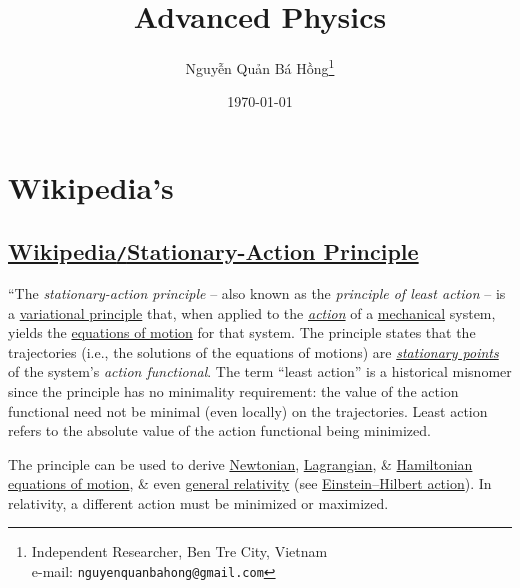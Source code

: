 \documentclass[oneside]{book}
\title{Advanced Physics}
\author{\selectlanguage{vietnamese} Nguyễn Quản Bá Hồng\footnote{Independent Researcher, Ben Tre City, Vietnam\\e-mail: \texttt{nguyenquanbahong@gmail.com}}}
\date{\today}
\numberwithin{equation}{section}
\begin{document}
\maketitle
\setcounter{secnumdepth}{4}
\setcounter{tocdepth}{4}
\tableofcontents


\chapter{Wikipedia's}

\section{\href{https://en.wikipedia.org/wiki/Stationary-action_principle}{Wikipedia\texttt{/}Stationary-Action Principle}}
``The \textit{stationary-action principle} -- also known as the \textit{principle of least action} -- is a \href{https://en.wikipedia.org/wiki/Variational_principle}{variational principle} that, when applied to the \href{https://en.wikipedia.org/wiki/Action_(physics)}{\textit{action}} of a \href{https://en.wikipedia.org/wiki/Mechanics}{mechanical} system, yields the \href{https://en.wikipedia.org/wiki/Equations_of_motion}{equations of motion} for that system. The principle states that the trajectories (i.e., the solutions of the equations of motions) are \href{https://en.wikipedia.org/wiki/Stationary_point}{\textit{stationary points}} of the system's \textit{action functional}. The term ``least action'' is a historical misnomer since the principle has no minimality requirement: the value of the action functional need not be minimal (even locally) on the trajectories. Least action refers to the absolute value of the action functional being minimized.

The principle can be used to derive \href{https://en.wikipedia.org/wiki/Newtonian_mechanics}{Newtonian}, \href{https://en.wikipedia.org/wiki/Lagrangian_mechanics}{Lagrangian}, \& \href{https://en.wikipedia.org/wiki/Hamiltonian_mechanics}{Hamiltonian} \href{https://en.wikipedia.org/wiki/Equations_of_motion}{equations of motion}, \& even \href{https://en.wikipedia.org/wiki/General_relativity}{general relativity} (see \href{https://en.wikipedia.org/wiki/Einstein%E2%80%93Hilbert_action}{Einstein--Hilbert action}). In relativity, a different action must be minimized or maximized.
\end{document}
